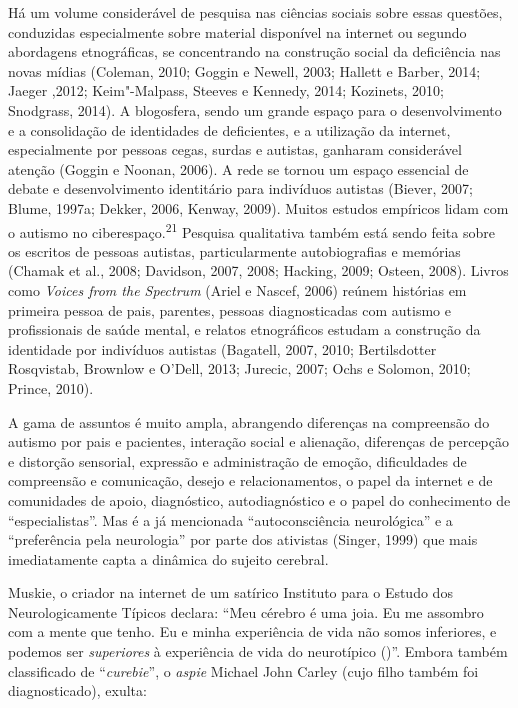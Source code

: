 Há um volume considerável de pesquisa nas ciências sociais sobre essas
questões, conduzidas especialmente sobre material disponível na internet
ou segundo abordagens etnográficas, se concentrando na construção social
da deficiência nas novas mídias (Coleman, 2010; Goggin e Newell, 2003;
Hallett e Barber, 2014; Jaeger ,2012; Keim"-Malpass, Steeves e Kennedy,
2014; Kozinets, 2010; Snodgrass, 2014). A blogosfera, sendo um grande
espaço para o desenvolvimento e a consolidação de identidades de
deficientes, e a utilização da internet, especialmente por pessoas
cegas, surdas e autistas, ganharam considerável atenção (Goggin e
Noonan, 2006). A rede se tornou um espaço essencial de debate e
desenvolvimento identitário para indivíduos autistas (Biever, 2007;
Blume, 1997a; Dekker, 2006, Kenway, 2009). Muitos estudos empíricos
lidam com o autismo no ciberespaço.\textsuperscript{21} Pesquisa
qualitativa também está sendo feita sobre os escritos de pessoas
autistas, particularmente autobiografias e memórias (Chamak et al.,
2008; Davidson, 2007, 2008; Hacking, 2009; Osteen, 2008). Livros como
\emph{Voices from the Spectrum} (Ariel e Nascef, 2006) reúnem histórias
em primeira pessoa de pais, parentes, pessoas diagnosticadas com autismo
e profissionais de saúde mental, e relatos etnográficos estudam a
construção da identidade por indivíduos autistas (Bagatell, 2007, 2010;
Bertilsdotter Rosqvistab, Brownlow e O'Dell, 2013; Jurecic, 2007; Ochs e
Solomon, 2010; Prince, 2010).

A gama de assuntos é muito ampla, abrangendo diferenças na compreensão
do autismo por pais e pacientes, interação social e alienação,
diferenças de percepção e distorção sensorial, expressão e administração
de emoção, dificuldades de compreensão e comunicação, desejo e
relacionamentos, o papel da internet e de comunidades de apoio,
diagnóstico, autodiagnóstico e o papel do conhecimento de
``especialistas''. Mas é a já mencionada ``autoconsciência neurológica''
e a ``preferência pela neurologia'' por parte dos ativistas (Singer,
1999) que mais imediatamente capta a dinâmica do sujeito cerebral.

Muskie, o criador na internet de um satírico Instituto para o Estudo dos
Neurologicamente Típicos declara: ``Meu cérebro é uma joia. Eu me
assombro com a mente que tenho. Eu e minha experiência de vida não somos
inferiores, e podemos ser \emph{superiores} à experiência de vida do
neurotípico ()''. Embora também classificado de ``\emph{curebie}'', o
\emph{aspie} Michael John Carley (cujo filho também foi diagnosticado),
exulta:

